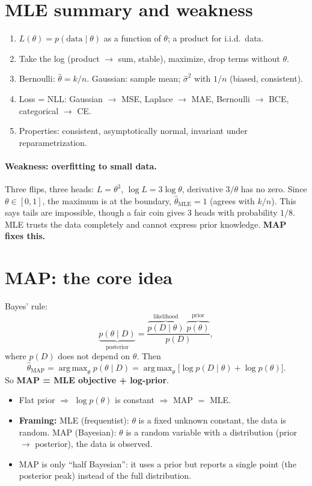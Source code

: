 \documentclass[11pt,a4paper]{article}
\DeclareMathOperator*{\argmax}{arg\,max}
\begin{document}
\section{MLE summary and weakness}
\begin{enumerate}[nosep]
  \item $L(\theta)=p(\text{data}\mid\theta)$ as a function of $\theta$; a product for i.i.d.\ data.
  \item Take the log (product $\to$ sum, stable), maximize, drop terms without $\theta$.
  \item Bernoulli: $\hat\theta=k/n$. Gaussian: sample mean; $\hat\sigma^2$ with $1/n$ (biased, consistent).
  \item Loss = NLL: Gaussian $\to$ MSE, Laplace $\to$ MAE, Bernoulli $\to$ BCE, categorical $\to$ CE.
  \item Properties: consistent, asymptotically normal, invariant under reparametrization.
\end{enumerate}

\paragraph{Weakness: overfitting to small data.} Three flips, three heads: $L=\theta^3$, $\log L=3\log\theta$, derivative $3/\theta$ has no zero. Since $\theta\in[0,1]$, the maximum is at the boundary, $\hat\theta_{\text{MLE}}=1$ (agrees with $k/n$). This says tails are impossible, though a fair coin gives 3 heads with probability $1/8$. MLE trusts the data completely and cannot express prior knowledge. \textbf{MAP fixes this.}

\section{MAP: the core idea}
Bayes' rule:
\[
\underbrace{p(\theta\mid D)}_{\text{posterior}}=\frac{\overbrace{p(D\mid\theta)}^{\text{likelihood}}\;\overbrace{p(\theta)}^{\text{prior}}}{p(D)} ,
\]
where $p(D)$ does not depend on $\theta$. Then
\[
\hat\theta_{\text{MAP}}=\argmax_\theta p(\theta\mid D)=\argmax_\theta\big[\log p(D\mid\theta)+\log p(\theta)\big].
\]
So \textbf{MAP = MLE objective + log-prior}.

\begin{itemize}[nosep]
  \item Flat prior $\Rightarrow$ $\log p(\theta)$ is constant $\Rightarrow$ MAP $=$ MLE.
  \item \textbf{Framing:} MLE (frequentist): $\theta$ is a fixed unknown constant, the data is random. MAP (Bayesian): $\theta$ is a random variable with a distribution (prior $\to$ posterior), the data is observed.
  \item MAP is only ``half Bayesian'': it uses a prior but reports a single point (the posterior peak) instead of the full distribution.
\end{itemize}
\end{document}
